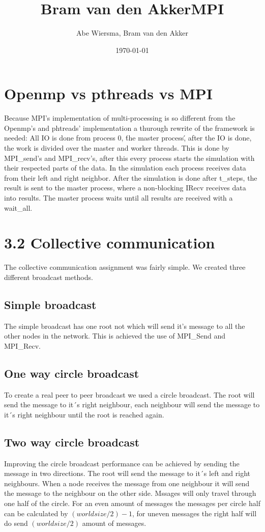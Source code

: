 \documentclass[10pt]{article}
\title{\bfseries\Huge Bram van den Akker}
\date{}
\begin{document}
\title{MPI}
\author{Abe Wiersma, Bram van den Akker}
\date{\today}
\maketitle
\newpage

\section{Openmp vs pthreads vs MPI}
Because MPI's implementation of multi-processing is so different from the Openmp's and phtreads' implementation a thurough rewrite of the framework is needed:
All IO is done from process 0, \'the master process\', after the IO is done, the work is divided over the master and worker threads.
This is done by MPI\_send's and MPI\_recv's, after this every process starts the simulation with their respected parts of the data.
In the simulation each process receives data from their left and right neighbor.
After the simulation is done after t\_steps, the result is sent to the master process, where a non-blocking IRecv receives data into results. The master process waits until all results are received with a wait\_all.

\section{3.2 Collective communication}
The collective communication assignment was fairly simple. We created three different broadcast methods. 

\subsection{Simple broadcast}
The simple broadcast has one root not which will send it's message to all the other nodes in the network. This is achieved the use of MPI\_Send and MPI\_Recv.
\subsection{One way circle broadcast}
To create a real peer to peer broadcast we used a circle broadcast. The root will send the message to it´s right neighbour, each neighbour will send the message to it´s right neighbour until the root is reached again. 
\subsection{Two way circle broadcast}
Improving the circle broadcast performance can be achieved by sending the message in two directions. The root will send the message to it´s left and right neighbours. When a node receives the message from one neighbour it will send the message to the neighbour on the other side. Mssages will only travel through one half of the circle. For an even amount of messages the messages per circle half can be calculated by $(world size / 2) - 1$, for uneven messages the right half will do send $(world size / 2)$ amount of messages.
\end{document}
